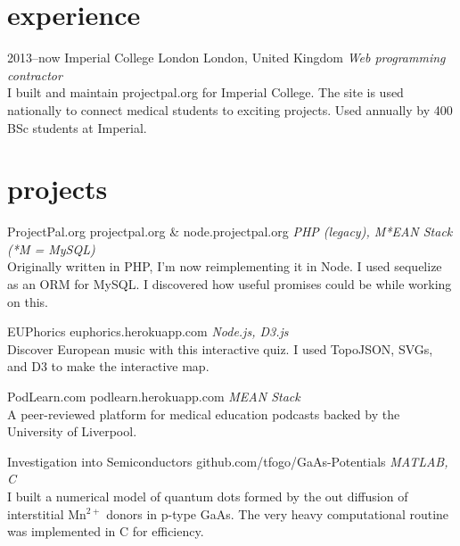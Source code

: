 \documentclass[]{friggeri-cv} %
\begin{document}
\section{\color{red}experience}

\begin{entrylist}
\entry
{2013--now}
{Imperial College London}
{London, United Kingdom}
{\emph{Web programming contractor} \\
I built and maintain projectpal.org for Imperial College. The site is used nationally to connect medical students to exciting projects. Used annually by 400 BSc students at Imperial.}
\end{entrylist}

\section{\color{orange}projects}

\begin{entrylist}
\entry
{}
{ProjectPal.org}
{projectpal.org \& node.projectpal.org}
{\emph{PHP (legacy), M*EAN Stack (*M = MySQL)} \\
Originally written in PHP, I'm now reimplementing it in Node. I used sequelize as an ORM for MySQL. I discovered how useful promises could be while working on this.}
\end{entrylist}

\begin{entrylist}
\entry
{}
{EUPhorics}
{euphorics.herokuapp.com}
{\emph{Node.js, D3.js} \\
Discover European music with this interactive quiz. I used TopoJSON, SVGs, and D3 to make the interactive map.}
\end{entrylist}

\begin{entrylist}
\entry
{}
{PodLearn.com}
{podlearn.herokuapp.com}
{\emph{MEAN Stack} \\
A peer-reviewed platform for medical education podcasts backed by the University of Liverpool.}
\end{entrylist}

\begin{entrylist}
\entry
{}
{Investigation into Semiconductors}
{github.com/tfogo/GaAs-Potentials}
{\emph{MATLAB, C} \\
I built a numerical model of quantum dots formed by the out diffusion of interstitial Mn$^{2+}$ donors in p-type GaAs. The very heavy computational routine was implemented in C for efficiency.}
\end{entrylist}
\end{document}
